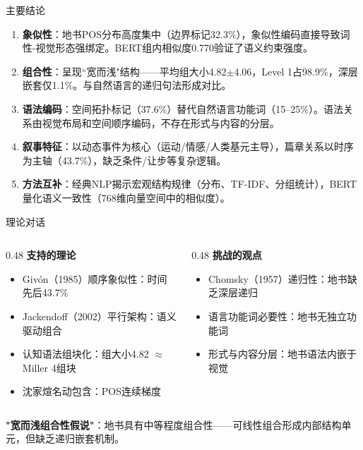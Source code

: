 \documentclass[aspectratio=169,xcolor=x11names,compress]{ctexbeamer}
\begin{document}
\begin{frame}{主要结论}
\begin{enumerate}
    \item \textbf{象似性}：地书POS分布高度集中（边界标记32.3\%），象似性编码直接导致词性-视觉形态强绑定。BERT组内相似度0.770验证了语义约束强度。
    \item \textbf{组合性}：呈现``宽而浅"结构——平均组大小4.82$\pm$4.06，Level 1占98.9\%，深层嵌套仅1.1\%。与自然语言的递归句法形成对比。
    \item \textbf{语法编码}：空间拓扑标记（37.6\%）替代自然语言功能词（15--25\%）。语法关系由视觉布局和空间顺序编码，不存在形式与内容的分层。
    \item \textbf{叙事特征}：以动态事件为核心（运动/情感/人类基元主导），篇章关系以时序为主轴（43.7\%），缺乏条件/让步等复杂逻辑。
    \item \textbf{方法互补}：经典NLP揭示宏观结构规律（分布、TF-IDF、分组统计），BERT量化语义一致性（768维向量空间中的相似度）。
\end{enumerate}
\end{frame}

\begin{frame}{理论对话}
\begin{columns}
\begin{column}{0.48\textwidth}
\textbf{支持的理论}
\begin{itemize}
    \item Givón（1985）顺序象似性：时间先后43.7\%
    \item Jackendoff（2002）平行架构：语义驱动组合
    \item 认知语法组块化：组大小4.82 $\approx$ Miller 4组块
    \item 沈家煊名动包含：POS连续梯度
\end{itemize}
\end{column}
\begin{column}{0.48\textwidth}
\textbf{挑战的观点}
\begin{itemize}
    \item Chomsky（1957）递归性：地书缺乏深层递归
    \item 语言功能词必要性：地书无独立功能词
    \item 形式与内容分层：地书语法内嵌于视觉
\end{itemize}
\end{column}
\end{columns}

\vspace{0.5em}
\centering\footnotesize
\textbf{"宽而浅组合性假说"}：地书具有中等程度组合性——可线性组合形成内部结构单元，但缺乏递归嵌套机制。
\end{frame}
\end{document}
